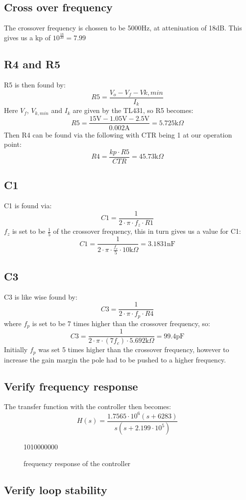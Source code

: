 \subsection{Cross over frequency}
The crossover frequency is chossen to be 5000Hz, at atteniuation of 18dB. This gives us a kp of $10^{\frac{18}{20}}=7.99$
\subsection{R4 and R5}
R5 is then found by:
\[
R5= \frac{V_o - V_f - V{k,min}}{I_k}
\]
Here $V_f$, $V_{k,min}$ and $I_k$ are given by the TL431, so R5 becomes:
\[
R5 = \frac{15\text{V} - 1.05\text{V} - 2.5\text{V}}{0.002\text{A}} = 5.725 \text{k}\Omega
\]
Then R4 can be found via the following with CTR being 1 at our operation point:%
\[
R4 = \frac{kp \cdot R5}{CTR} = 45.73\text{k}\Omega
\]
\subsection{C1}
C1 is found via:
\[
C1=\frac{1}{2\cdot\pi\cdot f_z \cdot R1}
\]
$f_z$ is set to be $\frac{1}{5}$ of the crossover frequency, this in turn gives us a value for C1:
\[
C1 = \frac{1}{2\cdot\pi\cdot \frac{f_c}{5} \cdot 10\text{k}\Omega} = 3.1831 \text{nF}
\]
\subsection{C3}
C3 is like wise found by:
\[
C3 = \frac{1}{2\cdot\pi\cdot f_p \cdot R4}
\]
where $f_p$ is set to be 7 times higher than the crossover frequency, so:
\[
C3 = \frac{1}{2\cdot\pi\cdot (7f_c) \cdot 5.692\text{k}\Omega}=99.4 \text{pF}
\]
Initially $f_p$ was set 5 times higher than the crossover frequency, however to increase the gain margin the pole had to be pushed to a higher frequency.

\subsection{Verify frequency response}
The transfer function with the controller then becomes:
\[
H(s)=\frac{1.7565\cdot10^6(s + 6283)}{s(s+2.199\cdot10^5)}
\]
\begin{figure}[H]
    \centering
    {10}{10000000}
    \caption{frequency response of the controller}
    \label{fig:bp2}
\end{figure}
\subsection{Verify loop stability}

